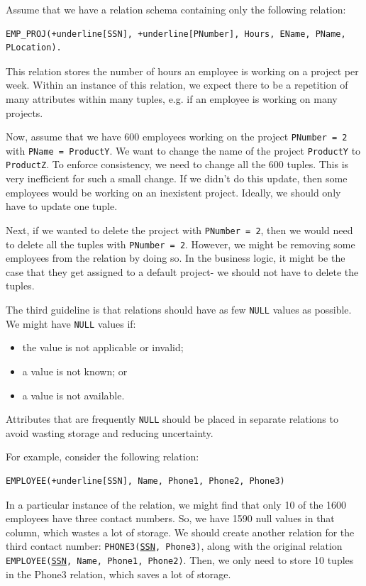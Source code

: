 \documentclass[a4paper, openany]{memoir}
\begin{document}
Assume that we have a relation schema containing only the following relation:
\begin{Verbatim}[commandchars=+\[\]]
EMP_PROJ(+underline[SSN], +underline[PNumber], Hours, EName, PName, PLocation).
\end{Verbatim}
This relation stores the number of hours an employee is working on a project per week. Within an instance of this relation, we expect there to be a repetition of many attributes within many tuples, e.g. if an employee is working on many projects. 

Now, assume that we have 600 employees working on the project \texttt{PNumber = 2} with \texttt{PName = ProductY}. We want to change the name of the project \texttt{ProductY} to \texttt{ProductZ}. To enforce consistency, we need to change all the 600 tuples. This is very inefficient for such a small change. If we didn't do this update, then some employees would be working on an inexistent project. Ideally, we should only have to update one tuple.

Next, if we wanted to delete the project with \texttt{PNumber = 2}, then we would need to delete all the tuples with \texttt{PNumber = 2}. However, we might be removing some employees from the relation by doing so. In the business logic, it might be the case that they get assigned to a default project- we should not have to delete the tuples.

The third guideline is that relations should have as few \texttt{NULL} values as possible. We might have \texttt{NULL} values if:
\begin{itemize}
    \item the value is not applicable or invalid;
    \item a value is not known; or
    \item a value is not available.
\end{itemize}
Attributes that are frequently \texttt{NULL} should be placed in separate relations to avoid wasting storage and reducing uncertainty.

For example, consider the following relation: 
\begin{Verbatim}[commandchars=+\[\]]
EMPLOYEE(+underline[SSN], Name, Phone1, Phone2, Phone3)
\end{Verbatim}
In a particular instance of the relation, we might find that only 10 of the 1600 employees have three contact numbers. So, we have 1590 null values in that column, which wastes a lot of storage. We should create another relation for the third contact number: \texttt{PHONE3(\underline{SSN}, Phone3)}, along with the original relation \texttt{EMPLOYEE(\underline{SSN}, Name, Phone1, Phone2)}. Then, we only need to store 10 tuples in the Phone3 relation, which saves a lot of storage.
\end{document}
